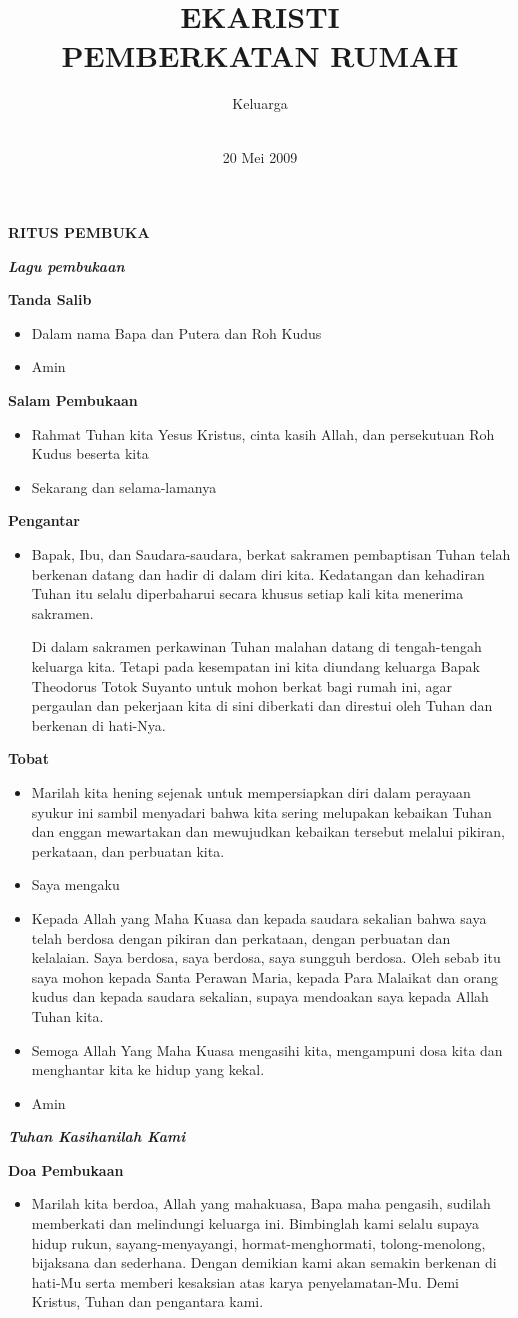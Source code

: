 \documentclass[a4paper,11pt]{scrbook}
\title{EKARISTI \\PEMBERKATAN RUMAH}
\author{
Keluarga \keluarga \\ \\
}
\date{20 Mei 2009}
\makeatletter
\newcommand{\judul}[1]{%
  {\parindent \z@ \centering 
    \interlinepenalty\@M \Large \bfseries #1\par\nobreak \vskip 20\p@ }}
\newcommand{\subjudul}[1]{%
  {\parindent \z@ 
    \interlinepenalty\@M \bfseries #1\par\nobreak \vskip 10\p@ }}
\newcommand{\lagu}[1]{%
  {\parindent \z@ 
    \interlinepenalty\@M \bfseries \textsl{#1}\par\nobreak \vskip 20\p@ }}
\newcommand{\BU}[1]{\begin{itemize} \item[U:] #1 \end{itemize}}
\newcommand{\BI}[1]{\begin{itemize} \item[I:] #1 \end{itemize}}
\newcommand{\keluarga}{Theodorus Totok Suyanto }
\newcommand{\lagupembukaan}{~}
\makeatother
\begin{document}
\sffamily
\maketitle
\LARGE  
\thispagestyle{empty}
\newpage
\judul{RITUS PEMBUKA}

\lagu{Lagu pembukaan \lagupembukaan}

\subjudul{Tanda Salib}
\BI{Dalam nama Bapa dan Putera dan Roh Kudus}
\BU{Amin}

\subjudul{Salam Pembukaan}
\BI{Rahmat Tuhan kita Yesus Kristus, cinta kasih Allah, dan persekutuan Roh Kudus beserta kita}
\BU{Sekarang dan selama-lamanya}

\subjudul{Pengantar}
\BI{Bapak, Ibu, dan Saudara-saudara, berkat sakramen pembaptisan Tuhan telah berkenan datang dan hadir di dalam diri kita. Kedatangan dan kehadiran Tuhan itu selalu diperbaharui secara khusus setiap kali kita menerima sakramen. 

Di dalam sakramen perkawinan Tuhan malahan datang di tengah-tengah keluarga kita. Tetapi pada kesempatan ini kita diundang keluarga Bapak \keluarga untuk mohon berkat bagi rumah ini, agar pergaulan dan pekerjaan kita di sini diberkati dan direstui oleh Tuhan dan berkenan di hati-Nya.}

\subjudul{Tobat}
\BI{Marilah kita hening sejenak untuk mempersiapkan diri dalam perayaan syukur ini sambil menyadari bahwa kita sering melupakan kebaikan Tuhan dan enggan mewartakan dan mewujudkan kebaikan tersebut melalui pikiran, perkataan, dan perbuatan kita.}

\BI{Saya mengaku}

\BU{Kepada Allah yang Maha Kuasa dan kepada saudara sekalian bahwa saya telah berdosa dengan pikiran dan perkataan, dengan perbuatan dan kelalaian. Saya berdosa, saya berdosa, saya sungguh berdosa. Oleh sebab itu saya mohon kepada Santa Perawan Maria, kepada Para Malaikat dan orang kudus dan kepada saudara sekalian, supaya mendoakan saya kepada Allah Tuhan kita.}

\BI{Semoga Allah Yang Maha Kuasa mengasihi kita, mengampuni dosa kita dan menghantar kita ke hidup yang kekal.}

\BU{Amin}

\lagu{Tuhan Kasihanilah Kami}

\subjudul{Doa Pembukaan}

\BI{Marilah kita berdoa,
Allah yang mahakuasa, Bapa maha pengasih, sudilah memberkati dan melindungi keluarga ini. Bimbinglah kami selalu supaya hidup rukun, sayang-menyayangi, hormat-menghormati, tolong-menolong, bijaksana dan sederhana. Dengan demikian kami akan semakin berkenan di hati-Mu serta memberi kesaksian atas karya penyelamatan-Mu. Demi Kristus, Tuhan dan pengantara kami.}
\end{document}
